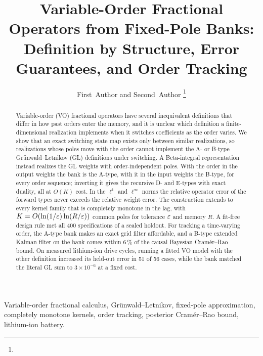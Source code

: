 \documentclass[journal]{IEEEtran}
\begin{document}
\title{Variable-Order Fractional Operators from Fixed-Pole Banks: Definition by Structure, Error Guarantees, and Order Tracking}

\author{First~Author and Second~Author%
\thanks{}}

\maketitle

\begin{abstract}
Variable-order (VO) fractional operators have several inequivalent definitions that differ in how past orders enter the memory, and it is unclear which definition a finite-dimensional realization implements when it switches coefficients as the order varies. We show that an exact switching state map exists only between similar realizations, so realizations whose poles move with the order cannot implement the A- or B-type Gr\"unwald--Letnikov (GL) definitions under switching. A Beta-integral representation instead realizes the GL weights with order-independent poles. With the order in the output weights the bank is the A-type, with it in the input weights the B-type, for every order sequence; inverting it gives the recursive D- and E-types with exact duality, all at $O(K)$ cost. In the $\ell^1$ and $\ell^\infty$ norms the relative operator error of the forward types never exceeds the relative weight error. The construction extends to every kernel family that is completely monotone in the lag, with $K=O(\ln(1/\varepsilon)\ln(R/\varepsilon))$ common poles for tolerance $\varepsilon$ and memory $R$. A fit-free design rule met all 400 specifications of a sealed holdout. For tracking a time-varying order, the A-type bank makes an exact grid filter affordable, and a B-type extended Kalman filter on the bank comes within 6\,\% of the causal Bayesian Cram\'er--Rao bound. On measured lithium-ion drive cycles, running a fitted VO model with the other definition increased its held-out error in 51 of 56 cases, while the bank matched the literal GL sum to $3\times10^{-6}$ at a fixed cost.
\end{abstract}

\begin{IEEEkeywords}
Variable-order fractional calculus, Gr\"unwald--Letnikov, fixed-pole approximation, completely monotone kernels, order tracking, posterior Cram\'er--Rao bound, lithium-ion battery.
\end{IEEEkeywords}





\end{document}
